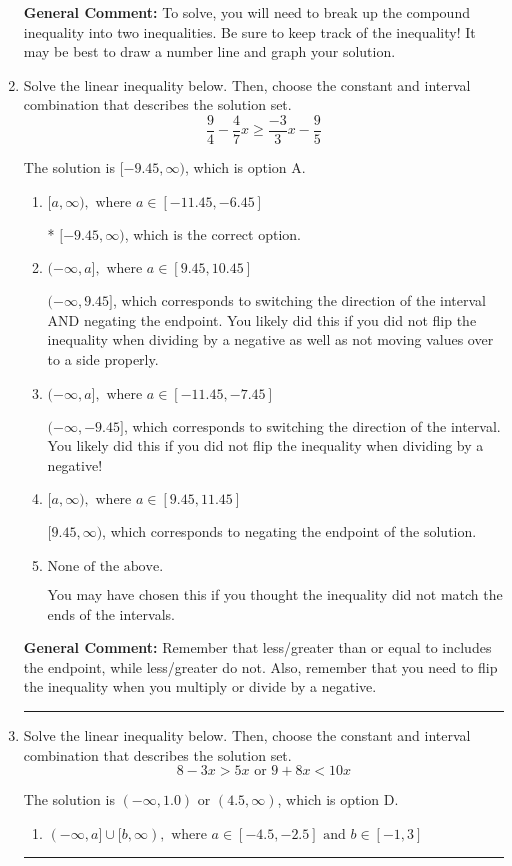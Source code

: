 \documentclass{extbook}[14pt]
\newcommand{\litem}[1]{\item #1

\rule{\textwidth}{0.4pt}}
\begin{document}
\begin{enumerate}
{\textbf{General Comment:} To solve, you will need to break up the compound inequality into two inequalities. Be sure to keep track of the inequality! It may be best to draw a number line and graph your solution.
}
\litem{
Solve the linear inequality below. Then, choose the constant and interval combination that describes the solution set.
\[ \frac{9}{4} - \frac{4}{7} x \geq \frac{-3}{3} x - \frac{9}{5} \]

The solution is \( [-9.45, \infty) \), which is option A.\begin{enumerate}[label=\Alph*.]
\item \( [a, \infty), \text{ where } a \in [-11.45, -6.45] \)

* $[-9.45, \infty)$, which is the correct option.
\item \( (-\infty, a], \text{ where } a \in [9.45, 10.45] \)

 $(-\infty, 9.45]$, which corresponds to switching the direction of the interval AND negating the endpoint. You likely did this if you did not flip the inequality when dividing by a negative as well as not moving values over to a side properly.
\item \( (-\infty, a], \text{ where } a \in [-11.45, -7.45] \)

 $(-\infty, -9.45]$, which corresponds to switching the direction of the interval. You likely did this if you did not flip the inequality when dividing by a negative!
\item \( [a, \infty), \text{ where } a \in [9.45, 11.45] \)

 $[9.45, \infty)$, which corresponds to negating the endpoint of the solution.
\item \( \text{None of the above}. \)

You may have chosen this if you thought the inequality did not match the ends of the intervals.
\end{enumerate}

\textbf{General Comment:} Remember that less/greater than or equal to includes the endpoint, while less/greater do not. Also, remember that you need to flip the inequality when you multiply or divide by a negative.
}
\litem{
Solve the linear inequality below. Then, choose the constant and interval combination that describes the solution set.
\[ 8 - 3 x > 5 x \text{ or } 9 + 8 x < 10 x \]

The solution is \( (-\infty, 1.0) \text{ or } (4.5, \infty) \), which is option D.\begin{enumerate}[label=\Alph*.]
\item \( (-\infty, a] \cup [b, \infty), \text{ where } a \in [-4.5, -2.5] \text{ and } b \in [-1, 3] \)


\end{enumerate}}
\end{enumerate}
\end{document}
